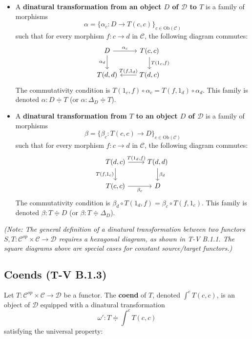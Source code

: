 \documentclass[11pt]{article}
\theoremstyle{definition}
\begin{document}
\begin{itemize}
\item A \textbf{dinatural transformation from an object \(D\) of \(\mathcal{D}\) to \(T\)} is a family of morphisms 
\[
\alpha = \{\alpha_c : D \to T(c, c)\}_{c \in \mathrm{Ob}(\mathcal{C})}
\]
such that for every morphism \( f: c \to d \) in \(\mathcal{C}\), the following diagram commutes:
\[
\begin{tikzcd}
D \arrow[r, "{\alpha_c}"] \arrow[d, "{\alpha_d}"'] & T(c,c) \arrow[d, "{T(1_c,f)}"] \\
T(d,d) & T(d,c) \arrow[l, "{T(f,1_d)}"']
\end{tikzcd}
\]
The commutativity condition is \( T(1_c,f) \circ \alpha_c = T(f,1_d) \circ \alpha_d \). This family is denoted \(\alpha: D \Doteq T\) (or \(\alpha: \Delta_D \Doteq T\)).

\item A \textbf{dinatural transformation from \(T\) to an object \(D\) of \(\mathcal{D}\)} is a family of morphisms 
\[
\beta = \{\beta_c : T(c, c) \to D\}_{c \in \mathrm{Ob}(\mathcal{C})}
\]
such that for every morphism \( f: c \to d \) in \(\mathcal{C}\), the following diagram commutes:
\[
\begin{tikzcd}
T(d,c) \arrow[r, "{T(1_d,f)}"] \arrow[d, "{T(f,1_c)}"'] & T(d,d) \arrow[d, "{\beta_d}"] \\
T(c,c) \arrow[r, "{\beta_c}"'] & D
\end{tikzcd}
\]
The commutativity condition is \( \beta_d \circ T(1_d,f) = \beta_c \circ T(f,1_c) \). This family is denoted \(\beta: T \Doteq D\) (or \(\beta: T \Doteq \Delta_D\)).
\end{itemize}

\emph{(Note: The general definition of a dinatural transformation between two functors \( S, T: \mathcal{C}^{op} \times \mathcal{C} \to \mathcal{D} \) requires a hexagonal diagram, as shown in T-V B.1.1. The square diagrams above are special cases for constant source/target functors.)}

\subsection*{Coends (T-V B.1.3)}

Let \( T: \mathcal{C}^{op} \times \mathcal{C} \to \mathcal{D} \) be a functor. The \textbf{coend} of \(T\), denoted \(\int^{c} T(c, c)\), is an object of \(\mathcal{D}\) equipped with a dinatural transformation 
\[
\omega' : T \Doteq \int^c T(c, c)
\]
satisfying the universal property:
\end{document}

